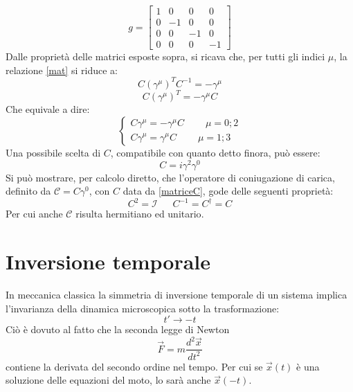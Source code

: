 \begin{equation}
 g = \begin{bmatrix} 1 & 0 & 0 & 0 \\ 0 & -1 & 0 & 0 \\ 0 & 0 & -1 & 0 \\ 0 & 0 & 0 & -1 \end{bmatrix}
\end{equation}
Dalle proprietà delle matrici esposte sopra, si ricava che, per tutti gli indici $\mu$, la relazione \eqref{mat} si riduce a:
\begin{equation}
 C(\gamma^{\mu})^T C^{-1} = - \gamma^{\mu}
\end{equation}
\begin{equation}
 C(\gamma^{\mu})^T = -\gamma^{\mu} C
\end{equation}
Che equivale a dire:
\begin{displaymath}
\left\{
\begin{array}{l}
 C\gamma^{\mu} = -\gamma^{\mu} C \ \ \ \ \ \ \ \ \ \ \mu = 0; 2 \\
 C\gamma^{\mu} =  \gamma^{\mu} C \ \ \ \ \ \ \ \ \ \ \mu = 1; 3
\end{array}
\right.
\end{displaymath}
Una possibile scelta di $C$, compatibile con quanto detto finora, pu\`o essere:
\begin{equation} \label{matriceC}
 C = i\gamma^2\gamma^0
\end{equation}
Si può mostrare, per calcolo diretto, che l'operatore di coniugazione di carica, definito da $\mathscr{C} = C\gamma^0$, con $C$ data da \eqref{matriceC}, gode 
delle seguenti proprietà:
\begin{equation}
 C^2 = \mathscr{I} \ \ \ \ \ \ \ C^{-1} = C^{\dag} = C
\end{equation}
Per cui anche $\mathscr{C}$ risulta hermitiano ed unitario\cite{BigiSanda}.
%
\section{Inversione temporale}
\noindent
In meccanica classica la simmetria di inversione temporale di un sistema implica l'invarianza della dinamica microscopica sotto la trasformazione:
\begin{equation}
t' \rightarrow -t
\end{equation}
 Ciò  è dovuto al fatto che la seconda legge di Newton 
\begin{equation}
\vec{F} = m \frac{d^2\vec{x}}{dt^2}
\end{equation}
contiene la derivata del secondo ordine nel tempo. 
Per cui se $\vec{x}(t)$ è una soluzione delle equazioni del moto, lo sar\`a anche $\vec{x}(-t)$. 

